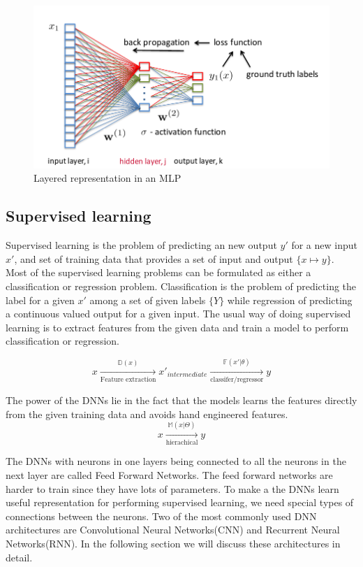 \documentclass[conference]{IEEEtran}
\newcommand*{\everymodeprime}{\ensuremath{\prime}}
\begin{document}
\begin{figure}
    \includegraphics[width=.99\linewidth]{img/mlp.png}  
    \caption{Layered representation in an MLP}
    \label{fig:mlp}
\end{figure}


\subsection{Supervised learning}
Supervised learning is the problem of predicting an new output $y\everymodeprime$  for a new input $x\everymodeprime$, and set of training data that provides a set of input and output $\{x \mapsto y\}$. Most of the supervised learning problems can be formulated as either a classification or regression problem. Classification is the problem of predicting the label for a given  $x\everymodeprime$ among a set of given labels $\{Y\}$ while regression of predicting a continuous  valued output for a given input. The usual way of doing supervised learning is to extract features from the given data and train a model to perform classification or regression. 


$$x \xrightarrow[\text{Feature extraction}]{ \mathbb{D}(x) } x\everymodeprime _{intermediate} \xrightarrow[\text{classifer/regressor}]{\mathbb{F}(x\everymodeprime | \theta)}   y$$

The power of the DNNs lie in the fact that the models learns the features directly from the given training data and avoids hand engineered features. 
$$ x \xrightarrow[ \text{hierachical}] { \mathbb{M}(x | \Theta) } y$$


The DNNs with neurons in one layers being connected to all the neurons in the next layer are called Feed Forward Networks. The feed forward networks are harder to train since they have lots of parameters. To make a the DNNs learn useful representation for performing supervised learning, we need special types of connections between the neurons. Two of the most commonly used DNN architectures are Convolutional Neural Networks(CNN) and Recurrent Neural Networks(RNN). In the following section we will discuss these architectures in detail.
\end{document}

